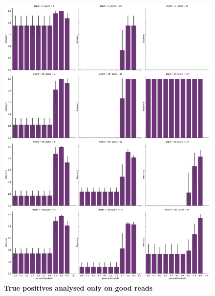 \documentclass[11pt, a4paper]{article}
\begin{document}
\begin{figure}[ht]
    \begin{center}
    \includegraphics[width=1\textwidth]{../results/images_notebook/v_312/good_reads_true_positves.pdf}
    \end{center}
    \caption{{\bf True positives analysed only on good reads }}
   \label{fig:v_312_good_reads_true_positves}
\end{figure}
\end{document}
